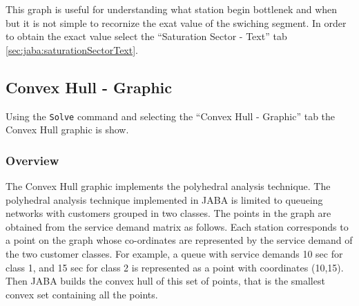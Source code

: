 This graph is useful for understanding what station begin bottlenek and when but it is not simple to recornize the exat value of the swiching segment. In order to obtain the exact value select the ``Saturation Sector - Text'' tab \autoref{sec:jaba:saturationSectorText}.



\subsection{Convex Hull - Graphic}
\label{sec:jaba:convexHullGraphic}

Using the \texttt{Solve} command and selecting the ``Convex Hull - Graphic'' 
tab the Convex Hull graphic is show.

\subsubsection{Overview}
The Convex Hull graphic implements the polyhedral analysis technique.
The polyhedral analysis technique implemented in JABA is limited to queueing networks with customers grouped in two classes. The points in the graph are obtained from the service demand matrix as follows. Each station corresponds to a point on the graph whose co-ordinates are represented by the service demand of the two customer classes. For example, a queue with service demands 10 sec for class 1, and 15 sec for class 2 is represented as a point with coordinates (10,15).  Then JABA builds the convex hull of this set of points, that is the smallest convex set containing all the points. 

